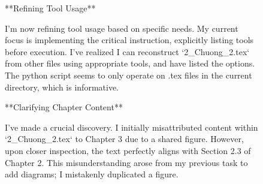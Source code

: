 \begin{figure}[htbp]
{{{{**Refining Tool Usage**

I'm now refining tool usage based on specific needs. My current focus is implementing the critical instruction, explicitly listing tools before execution. I've realized I can reconstruct `2_Chuong_2.tex` from other files using appropriate tools, and have listed the options. The python script seems to only operate on .tex files in the current directory, which is informative.


**Clarifying Chapter Content**

I've made a crucial discovery. I initially misattributed content within `2_Chuong_2.tex` to Chapter 3 due to a shared figure. However, upon closer inspection, the text perfectly aligns with Section 2.3 of Chapter 2. This misunderstanding arose from my previous task to add diagrams; I mistakenly duplicated a figure.


}}}}
\end{figure}

